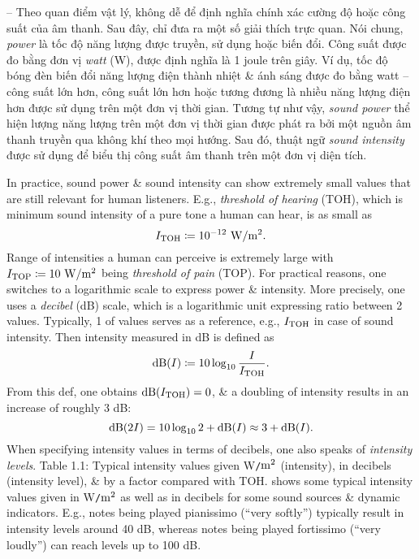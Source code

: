 \documentclass{article}
\begin{document}
\begin{itemize}
\begin{itemize}
\begin{itemize}
			-- Theo quan điểm vật lý, không dễ để định nghĩa chính xác cường độ hoặc công suất của âm thanh. Sau đây, chỉ đưa ra một số giải thích trực quan. Nói chung, {\it power} là tốc độ năng lượng được truyền, sử dụng hoặc biến đổi. Công suất được đo bằng đơn vị {\it watt} (W), được định nghĩa là 1 joule trên giây. Ví dụ, tốc độ bóng đèn biến đổi năng lượng điện thành nhiệt \& ánh sáng được đo bằng watt -- công suất lớn hơn, công suất lớn hơn hoặc tương đương là nhiều năng lượng điện hơn được sử dụng trên một đơn vị thời gian. Tương tự như vậy, {\it sound power} thể hiện lượng năng lượng trên một đơn vị thời gian được phát ra bởi một nguồn âm thanh truyền qua không khí theo mọi hướng. Sau đó, thuật ngữ {\it sound intensity} được sử dụng để biểu thị công suất âm thanh trên một đơn vị diện tích.
			
			In practice, sound power \& sound intensity can show extremely small values that are still relevant for human listeners. E.g., {\it threshold of hearing} (TOH), which is minimum sound intensity of a pure tone a human can hear, is as small as
			\begin{equation*}
				I_{\rm TOH}\coloneqq10^{-12}\ {\rm W{\tt/}m^2}.
			\end{equation*}
			Range of intensities a human can perceive is extremely large with $I_{\rm TOP}\coloneqq10\ {\rm W{\tt/}m^2}$ being {\it threshold of pain} (TOP). For practical reasons, one switches to a logarithmic scale to express power \& intensity. More precisely, one uses a {\it decibel} (dB) scale, which is a logarithmic unit expressing ratio between 2 values. Typically, 1 of values serves as a reference, e.g., $I_{\rm TOH}$ in case of sound intensity. Then intensity measured in dB is defined as
			\begin{equation*}
				{\rm dB}(I)\coloneqq10\log_{10}\frac{I}{I_{\rm TOH}}.
			\end{equation*}
			From this def, one obtains ${\rm dB}(I_{\rm TOH}) = 0$, \& a doubling of intensity results in an increase of roughly 3 dB:
			\begin{equation*}
				{\rm dB}(2I) = 10\log_{10}2 + {\rm dB}(I)\approx3 + {\rm dB}(I).
			\end{equation*}
			When specifying intensity values in terms of decibels, one also speaks of {\it intensity levels}. {\sf Table 1.1: Typical intensity values given W{\tt/}$\rm m^2$ (intensity), in decibels (intensity level), \& by a factor compared with TOH.} shows some typical intensity values given in W{\tt/}$\rm m^2$ as well as in decibels for some sound sources \& dynamic indicators. E.g., notes being played pianissimo (``very softly'') typically result in intensity levels around 40 dB, whereas notes being played fortissimo (``very loudly'') can reach levels up to 100 dB.
			

\end{itemize}
\end{itemize}
\end{itemize}
\end{document}
